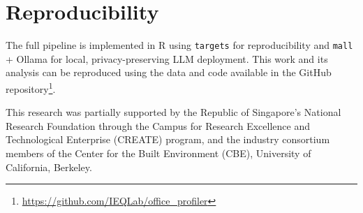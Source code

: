 \documentclass[sigconf]{acmart}
\begin{document}
\section*{Reproducibility}
The full pipeline is implemented in R using \texttt{targets} for reproducibility and \texttt{mall} + Ollama for local, privacy-preserving LLM deployment. This work and its analysis can be reproduced using the data and code available in the GitHub repository\footnote{\url{https://github.com/IEQLab/office_profiler}}.

\begin{acks}
This research was partially supported by the Republic of Singapore’s National Research Foundation through the Campus for Research Excellence and Technological Enterprise (CREATE) program, and the industry consortium members of the Center for the Built Environment (CBE), University of California, Berkeley.
\end{acks}



\end{document}

